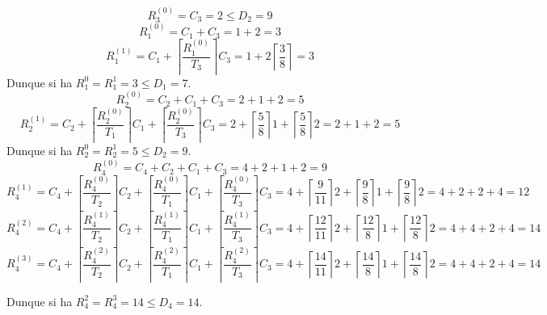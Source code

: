 \begin{Esercizio8}
\[ R_{3}^{(0)} = C_{3} = 2 \le  D_{2} = 9\]
\[R_{1}^{(0)} = C_{1} + C_{3} = 1 +2 = 3 \]
\[R_{1}^{(1)} = C_{1} + \left \lceil \frac{R_{1}^{(0)}}{T_{3}} \right \rceil C_{3} = 1 + 2 
\left \lceil \frac{3}{8} \right \rceil = 3 \]
Dunque si ha \(R_{1}^{0} = R_{1}^{1} = 3 \le D_{1} = 7\).
\[R_{2}^{(0)} = C_{2} + C_{1} + C_{3} = 2 + 1 + 2 = 5 \]
\[R_{2}^{(1)} = C_{2} + \left \lceil \frac{R_{2}^{(0)}}{T_{1}} \right \rceil C_{1} +
 \left \lceil \frac{R_{2}^{(0)}}{T_{3}} \right \rceil C_{3}
= 2 + \left \lceil \frac{5}{8} \right \rceil 1 + \left \lceil \frac{5}{8} \right \rceil 2 = 2 + 1 + 2 = 5 \]
Dunque si ha \(R_{2}^{0} = R_{2}^{1} = 5 \le D_{2} = 9\).
\[R_{4}^{(0)} = C_{4} + C_{2} + C_{1} + C_{3} = 4 + 2 + 1 + 2 = 9 \]
\[R_{4}^{(1)} = C_{4} + \left \lceil  \frac{R_{4}^{(0)}}{T_{2}} \right \rceil C_{2} +
 \left \lceil \frac{R_{4}^{(0)}}{T_{1}} \right \rceil C_{1} +
 \left \lceil \frac{R_{4}^{(0)}}{T_{3}} \right \rceil C_{3} = 
 4 + \left \lceil  \frac{9}{11} \right \rceil 2 
 + \left \lceil \frac{9}{8} \right \rceil 1 + \left \lceil \frac{9}{8} \right \rceil 2
  = 4 + 2 + 2 + 4 = 12 \]
\[R_{4}^{(2)} = C_{4} + \left \lceil  \frac{R_{4}^{(1)}}{T_{2}} \right \rceil C_{2} +
 \left \lceil \frac{R_{4}^{(1)}}{T_{1}} \right \rceil C_{1} +
 \left \lceil \frac{R_{4}^{(1)}}{T_{3}} \right \rceil C_{3} = 
 4 + \left \lceil  \frac{12}{11} \right \rceil 2 
 + \left \lceil \frac{12}{8} \right \rceil 1 + \left \lceil \frac{12}{8} \right \rceil 2
  = 4 + 4 + 2 + 4 = 14 \]
\[R_{4}^{(3)} = C_{4} + \left \lceil  \frac{R_{4}^{(2)}}{T_{2}} \right \rceil C_{2} +
 \left \lceil \frac{R_{4}^{(2)}}{T_{1}} \right \rceil C_{1} +
 \left \lceil \frac{R_{4}^{(2)}}{T_{3}} \right \rceil C_{3} = 
 4 + \left \lceil  \frac{14}{11} \right \rceil 2 
 + \left \lceil \frac{14}{8} \right \rceil 1 + \left \lceil \frac{14}{8} \right \rceil 2
  = 4 + 4 + 2 + 4 = 14 \]

Dunque si ha \(R_{4}^{2} = R_{4}^{3} = 14 \le D_{4} = 14\).

\end{Esercizio8}


